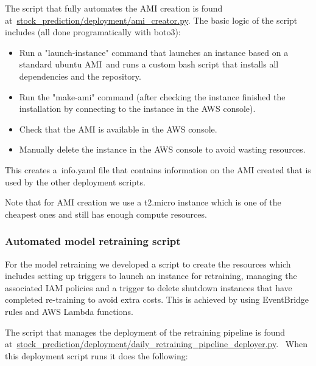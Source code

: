 \documentclass[10pt]{article}
\providecommand{\tightlist}{\setlength{\itemsep}{0pt}\setlength{\parskip}{0pt}}%
\begin{document}
The script that fully automates the AMI creation is found
at~\href{https://github.com/marcoopsampaio/aws_ml_eng_project_stock_prediction/blob/main/stock_prediction/deployment/ami_creator.py}{stock\_prediction/deployment/ami\_creator.py}.
The basic logic of the script includes (all done programatically with
boto3):

\begin{itemize}
\tightlist
\item
  Run a "launch-instance" command that launches an instance based on a
  standard ubuntu AMI~and runs a custom bash script that installs all
  dependencies and the repository.
\item
  Run the "make-ami" command (after checking the instance finished the
  installation by connecting to the instance in the AWS console).
\item
  Check that the AMI is available in the AWS console.
\item
  Manually delete the instance in the AWS console to avoid wasting
  resources.
\end{itemize}

This creates a~info.yaml file that contains information on the AMI
created that is used by the other deployment scripts.

Note that for AMI creation we use a t2.micro instance which is one of
the cheapest ones and still has enough compute resources.

\hypertarget{automated-model-retraining-script}{%
\subsubsection{Automated model retraining
script}}

{\label{864816}}

For the model retraining we developed a script to create the resources
which includes setting up triggers to launch an instance for retraining,
managing the associated IAM policies and a trigger to delete shutdown
instances that have completed re-training to avoid extra costs. This is
achieved by using EventBridge rules and AWS Lambda functions.

The script that manages the deployment of the retraining pipeline is
found
at~\href{https://github.com/marcoopsampaio/aws_ml_eng_project_stock_prediction/blob/main/stock_prediction/deployment/daily_retraining_pipeline_deployer.py}{stock\_prediction/deployment/daily\_retraining\_pipeline\_deployer.py}.~
When this deployment script runs it does the following:
\end{document}
